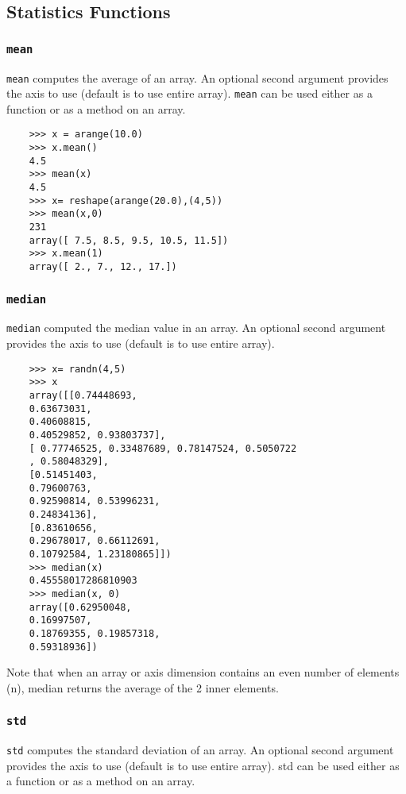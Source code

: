 \documentclass[KSmain.tex]{subfiles}
\begin{document}
 
	\large
	
\subsection{Statistics Functions}
\subsubsection*{\texttt{mean}}
\texttt{mean} computes the average of an array. An optional second argument provides the axis to use (default is
to use entire array). \texttt{mean} can be used either as a function or as a method on an array.
\begin{framed}
	\begin{verbatim}
	>>> x = arange(10.0)
	>>> x.mean()
	4.5
	>>> mean(x)
	4.5
	>>> x= reshape(arange(20.0),(4,5))
	>>> mean(x,0)
	231
	array([ 7.5, 8.5, 9.5, 10.5, 11.5])
	>>> x.mean(1)
	array([ 2., 7., 12., 17.])
	\end{verbatim}
\end{framed}
\subsubsection*{\texttt{median}}
\texttt{median} computed the median value in an array. An optional second argument provides the axis to use
(default is to use entire array).
\begin{framed}
	\begin{verbatim}
	>>> x= randn(4,5)
	>>> x
	array([[0.74448693,
	0.63673031,
	0.40608815,
	0.40529852, 0.93803737],
	[ 0.77746525, 0.33487689, 0.78147524, 0.5050722
	, 0.58048329],
	[0.51451403,
	0.79600763,
	0.92590814, 0.53996231,
	0.24834136],
	[0.83610656,
	0.29678017, 0.66112691,
	0.10792584, 1.23180865]])
	>>> median(x)
	0.45558017286810903
	>>> median(x, 0)
	array([0.62950048,
	0.16997507,
	0.18769355, 0.19857318,
	0.59318936])
	\end{verbatim}
\end{framed}
Note that when an array or axis dimension contains an even number of elements (n), median returns the
average of the 2 inner elements.
\subsubsection*{\texttt{std}}
\texttt{std} computes the standard deviation of an array. An optional second argument provides the axis to use
(default is to use entire array). std can be used either as a function or as a method on an array.
\end{document}
